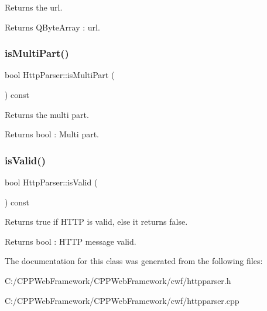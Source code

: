 Returns the url. 

\begin{DoxyReturn}{Returns}
Q\+Byte\+Array \+: url. 
\end{DoxyReturn}
\mbox{\label{class_http_parser_acbb3148607d2a3c80ba4e74573165f1d}} 
\subsubsection{\texorpdfstring{is\+Multi\+Part()}{isMultiPart()}}
{\footnotesize\ttfamily bool Http\+Parser\+::is\+Multi\+Part (\begin{DoxyParamCaption}{ }\end{DoxyParamCaption}) const}



Returns the multi part. 

\begin{DoxyReturn}{Returns}
bool \+: Multi part. 
\end{DoxyReturn}
\mbox{\label{class_http_parser_a75e0872ac2323b7bd583ea5547503a50}} 
\subsubsection{\texorpdfstring{is\+Valid()}{isValid()}}
{\footnotesize\ttfamily bool Http\+Parser\+::is\+Valid (\begin{DoxyParamCaption}{ }\end{DoxyParamCaption}) const}



Returns true if H\+T\+TP is valid, else it returns false. 

\begin{DoxyReturn}{Returns}
bool \+: H\+T\+TP message valid. 
\end{DoxyReturn}


The documentation for this class was generated from the following files\+:\begin{DoxyCompactItemize}
\item 
C\+:/\+C\+P\+P\+Web\+Framework/\+C\+P\+P\+Web\+Framework/cwf/httpparser.\+h\item 
C\+:/\+C\+P\+P\+Web\+Framework/\+C\+P\+P\+Web\+Framework/cwf/httpparser.\+cpp\end{DoxyCompactItemize}
